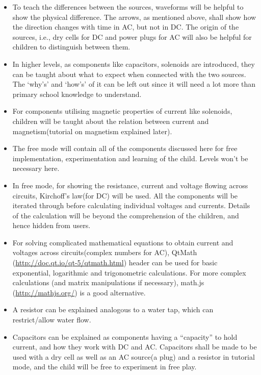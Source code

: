 \documentclass[preprint,12pt]{elsarticle}
\begin{document}
\begin{itemize}
\begin{itemize}
\begin{itemize}
					\item {To teach the differences between the sources, waveforms will be helpful to show the physical difference. The arrows, as mentioned above, shall show how the direction changes with time in AC, but not in DC. The origin of the sources, i.e., dry cells for DC and power plugs for AC will also be helpful for children to distinguish between them.}
					
					\item {In higher levels, as components like capacitors, solenoids are introduced, they can be taught about what to expect when connected with the two sources. The ‘why’s’ and ‘how’s’ of it can be left out since it will need a lot more than primary school knowledge to understand.}
					
					\item {For components utilising magnetic properties of current like solenoids, children will be taught about the relation between current and magnetism(tutorial on magnetism explained later).}
					
					\item {The free mode will contain all of the components discussed here for free implementation, experimentation and learning of the child. Levels won’t be necessary here.}
					
					\item {In free mode, for showing the resistance, current and voltage flowing across circuits, Kirchoff’s law(for DC) will be used. All the components will be iterated through before calculating individual voltages and currents. Details of the calculation will be beyond the comprehension of the children, and hence hidden from users.}
					
					\item {For solving complicated mathematical equations to obtain current and voltages across circuits(complex numbers for AC), QtMath (\href{http://doc.qt.io/qt-5/qtmath.html}{http://doc.qt.io/qt-5/qtmath.html}) header can be used for basic exponential, logarithmic and trigonometric calculations. For more complex calculations (and matrix manipulations if necessary), math.js (\href{http://mathjs.org/}{http://mathjs.org/}) is a good alternative.}

					\item {A resistor can be explained analogous to a water tap, which can  restrict/allow water flow.}
					
					\item {Capacitors can be explained as components having a “capacity” to hold current, and how they work with DC and AC. Capacitors shall be made to be used with a dry cell as well as an AC source(a plug) and a resistor in tutorial mode, and the child will be free to experiment in free play.}
					

\end{itemize}
\end{itemize}
\end{itemize}
\end{document}
